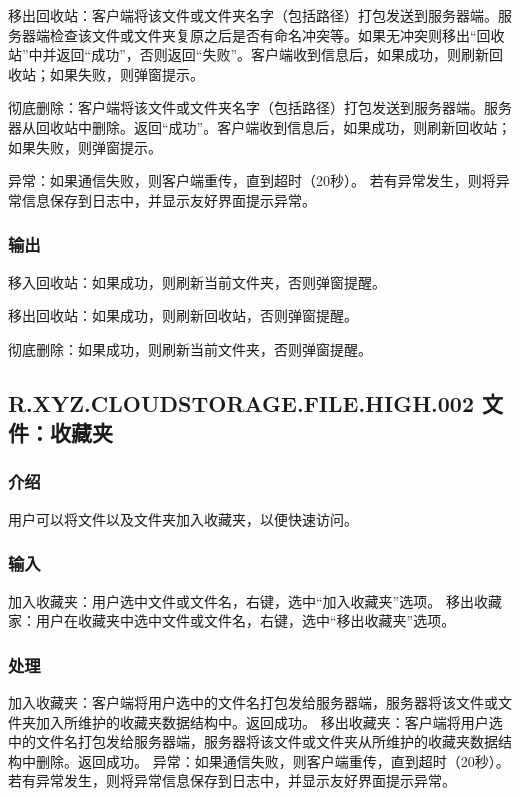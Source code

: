 移出回收站：客户端将该文件或文件夹名字（包括路径）打包发送到服务器端。服务器端检查该文件或文件夹复原之后是否有命名冲突等。如果无冲突则移出“回收站”中并返回“成功”，否则返回“失败”。客户端收到信息后，如果成功，则刷新回收站；如果失败，则弹窗提示。

彻底删除：客户端将该文件或文件夹名字（包括路径）打包发送到服务器端。服务器从回收站中删除。返回“成功”。客户端收到信息后，如果成功，则刷新回收站；如果失败，则弹窗提示。

异常：如果通信失败，则客户端重传，直到超时（20秒）。
若有异常发生，则将异常信息保存到日志中，并显示友好界面提示异常。

\subsubsection{输出} 
移入回收站：如果成功，则刷新当前文件夹，否则弹窗提醒。

移出回收站：如果成功，则刷新回收站，否则弹窗提醒。

彻底删除：如果成功，则刷新当前文件夹，否则弹窗提醒。



\subsection{R.XYZ.CLOUDSTORAGE.FILE.HIGH.002 文件：收藏夹}

\subsubsection{介绍} 
用户可以将文件以及文件夹加入收藏夹，以便快速访问。

\subsubsection{输入} 
加入收藏夹：用户选中文件或文件名，右键，选中“加入收藏夹”选项。
移出收藏家：用户在收藏夹中选中文件或文件名，右键，选中“移出收藏夹”选项。

\subsubsection{处理}
加入收藏夹：客户端将用户选中的文件名打包发给服务器端，服务器将该文件或文件夹加入所维护的收藏夹数据结构中。返回成功。
移出收藏夹：客户端将用户选中的文件名打包发给服务器端，服务器将该文件或文件夹从所维护的收藏夹数据结构中删除。返回成功。
异常：如果通信失败，则客户端重传，直到超时（20秒）。
若有异常发生，则将异常信息保存到日志中，并显示友好界面提示异常。


